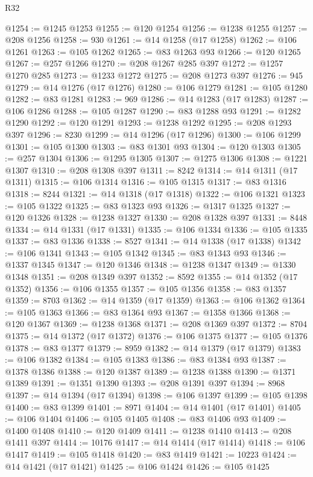 \begin{lexlean}{R32}
\begin{coremodule}
@1254 := @1245 @1253
@1255 := @120 @1254
@1256 := @1238 @1255
@1257 := @208 @1256
@1258 := 930
@1261 := @14 @1258 (@17 @1258)
@1262 := @106 @1261
@1263 := @105 @1262
@1265 := @83 @1263 @93
@1266 := @120 @1265
@1267 := @257 @1266
@1270 := @208 @1267 @285 @397
@1272 := @1257 @1270 @285
@1273 := @1233 @1272
@1275 := @208 @1273 @397
@1276 := 945
@1279 := @14 @1276 (@17 @1276)
@1280 := @106 @1279
@1281 := @105 @1280
@1282 := @83 @1281
@1283 := 969
@1286 := @14 @1283 (@17 @1283)
@1287 := @106 @1286
@1288 := @105 @1287
@1290 := @83 @1288 @93
@1291 := @1282 @1290
@1292 := @120 @1291
@1293 := @1238 @1292
@1295 := @208 @1293 @397
@1296 := 8230
@1299 := @14 @1296 (@17 @1296)
@1300 := @106 @1299
@1301 := @105 @1300
@1303 := @83 @1301 @93
@1304 := @120 @1303
@1305 := @257 @1304
@1306 := @1295 @1305
@1307 := @1275 @1306
@1308 := @1221 @1307
@1310 := @208 @1308 @397
@1311 := 8242
@1314 := @14 @1311 (@17 @1311)
@1315 := @106 @1314
@1316 := @105 @1315
@1317 := @83 @1316
@1318 := 8244
@1321 := @14 @1318 (@17 @1318)
@1322 := @106 @1321
@1323 := @105 @1322
@1325 := @83 @1323 @93
@1326 := @1317 @1325
@1327 := @120 @1326
@1328 := @1238 @1327
@1330 := @208 @1328 @397
@1331 := 8448
@1334 := @14 @1331 (@17 @1331)
@1335 := @106 @1334
@1336 := @105 @1335
@1337 := @83 @1336
@1338 := 8527
@1341 := @14 @1338 (@17 @1338)
@1342 := @106 @1341
@1343 := @105 @1342
@1345 := @83 @1343 @93
@1346 := @1337 @1345
@1347 := @120 @1346
@1348 := @1238 @1347
@1349 := @1330 @1348
@1351 := @208 @1349 @397
@1352 := 8592
@1355 := @14 @1352 (@17 @1352)
@1356 := @106 @1355
@1357 := @105 @1356
@1358 := @83 @1357
@1359 := 8703
@1362 := @14 @1359 (@17 @1359)
@1363 := @106 @1362
@1364 := @105 @1363
@1366 := @83 @1364 @93
@1367 := @1358 @1366
@1368 := @120 @1367
@1369 := @1238 @1368
@1371 := @208 @1369 @397
@1372 := 8704
@1375 := @14 @1372 (@17 @1372)
@1376 := @106 @1375
@1377 := @105 @1376
@1378 := @83 @1377
@1379 := 8959
@1382 := @14 @1379 (@17 @1379)
@1383 := @106 @1382
@1384 := @105 @1383
@1386 := @83 @1384 @93
@1387 := @1378 @1386
@1388 := @120 @1387
@1389 := @1238 @1388
@1390 := @1371 @1389
@1391 := @1351 @1390
@1393 := @208 @1391 @397
@1394 := 8968
@1397 := @14 @1394 (@17 @1394)
@1398 := @106 @1397
@1399 := @105 @1398
@1400 := @83 @1399
@1401 := 8971
@1404 := @14 @1401 (@17 @1401)
@1405 := @106 @1404
@1406 := @105 @1405
@1408 := @83 @1406 @93
@1409 := @1400 @1408
@1410 := @120 @1409
@1411 := @1238 @1410
@1413 := @208 @1411 @397
@1414 := 10176
@1417 := @14 @1414 (@17 @1414)
@1418 := @106 @1417
@1419 := @105 @1418
@1420 := @83 @1419
@1421 := 10223
@1424 := @14 @1421 (@17 @1421)
@1425 := @106 @1424
@1426 := @105 @1425

\end{coremodule}
\end{lexlean}
